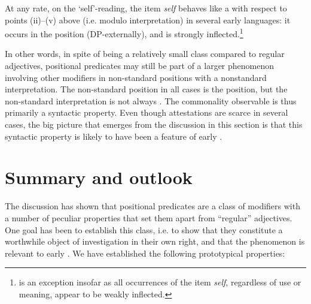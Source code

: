 \documentclass[output=paper,colorlinks,citecolor=brown]{langscibook}
\begin{document}
At any rate, on the `self'-reading, the item \textit{self}  behaves like a  with respect to points (ii)--(v) above (i.e. modulo  interpretation) in several early  languages:  it occurs in the  position (DP-externally), and is strongly inflected.\footnote{ is an exception insofar as all occurrences of the item \textit{self}, regardless of use or meaning, appear to be weakly inflected.  } 

In other words, in spite of being a relatively small class compared to regular adjectives, positional predicates may still be part of a larger phenomenon involving other modifiers in non-standard positions with a nonstandard interpretation. The non-standard position in all cases is the  position, but the non-standard interpretation is not always . The commonality observable is thus primarily a syntactic property. Even though attestations are scarce in several cases, the big picture that emerges from the discussion in this section is that this syntactic property is likely to have been a feature of early  . 












\section{Summary and outlook}
\label{sec:10:sum}

The discussion has shown that positional predicates are a class of modifiers with a number of peculiar properties that set them apart from ``regular'' adjectives. One goal has been to establish this class, i.e. to show that they constitute a worthwhile object of investigation in their own right, and that the phenomenon is relevant to early  . %
We have established the following prototypical properties:  %
\end{document}
